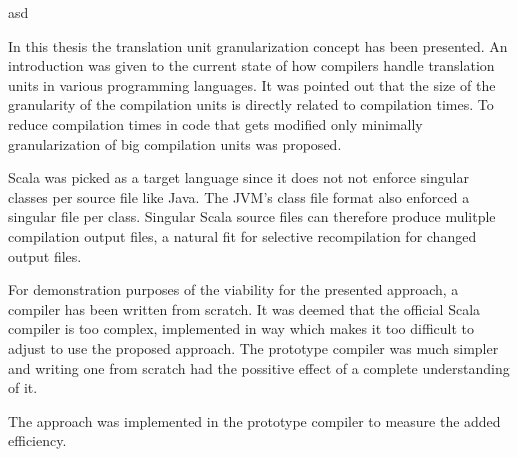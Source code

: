 \documentclass{VUMIFPSbakalaurinis}
\begin{document}
asd

\begin{figure}
\end{figure}


In this thesis the translation unit granularization concept has been presented.
An introduction was given to the current state of how compilers handle translation units in various programming languages.
It was pointed out that the size of the granularity of the compilation units is directly related to compilation times.
To reduce compilation times in code that gets modified only minimally granularization of big compilation units was proposed.

Scala was picked as a target language since it does not not enforce singular classes per source file like Java.
The JVM's class file format also enforced a singular file per class.
Singular Scala source files can therefore produce mulitple compilation output files, a natural fit for selective recompilation for changed output files.

For demonstration purposes of the viability for the presented approach, a compiler has been written from scratch.
It was deemed that the official Scala compiler is too complex, implemented in way which makes it too difficult to adjust to use the proposed approach.
The prototype compiler was much simpler and writing one from scratch had the possitive effect of a complete understanding of it.

The approach was implemented in the prototype compiler to measure the added efficiency.
\end{document}
